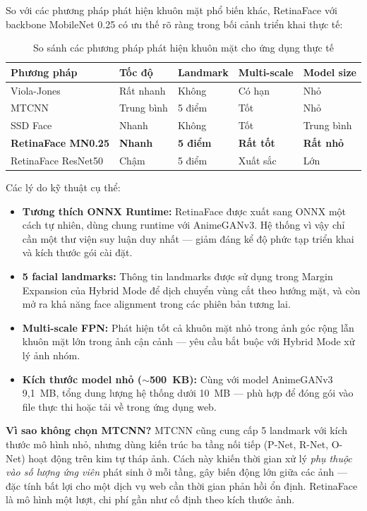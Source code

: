 So với các phương pháp phát hiện khuôn mặt phổ biến khác, RetinaFace với backbone MobileNet 0.25 có ưu thế rõ ràng trong bối cảnh triển khai thực tế:

\begin{table}[H]
\caption{So sánh các phương pháp phát hiện khuôn mặt cho ứng dụng thực tế}
\label{tab:face_det_comparison}
\centering
\begin{tabular}{|p{3cm}|p{2cm}|p{2.5cm}|p{2.5cm}|p{2.5cm}|}
\hline
\textbf{Phương pháp} & \textbf{Tốc độ} & \textbf{Landmark} & \textbf{Multi-scale} & \textbf{Model size} \\
\hline
Viola-Jones \cite{ViolaJones2004} & Rất nhanh & Không & Có hạn & Nhỏ \\
\hline
MTCNN \cite{Zhang2016MTCNN} & Trung bình & 5 điểm & Tốt & Nhỏ \\
\hline
SSD Face \cite{Liu2016SSD} & Nhanh & Không & Tốt & Trung bình \\
\hline
\textbf{RetinaFace MN0.25} \cite{Deng2019RetinaFace} & \textbf{Nhanh} & \textbf{5 điểm} & \textbf{Rất tốt} & \textbf{Rất nhỏ} \\
\hline
RetinaFace ResNet50 & Chậm & 5 điểm & Xuất sắc & Lớn \\
\hline
\end{tabular}
\end{table}

Các lý do kỹ thuật cụ thể:
\begin{itemize}
    \item \textbf{Tương thích ONNX Runtime:} RetinaFace được xuất sang ONNX một cách tự nhiên, dùng chung runtime với AnimeGANv3. Hệ thống vì vậy chỉ cần một thư viện suy luận duy nhất --- giảm đáng kể độ phức tạp triển khai và kích thước gói cài đặt.
    \item \textbf{5 facial landmarks:} Thông tin landmarks được sử dụng trong Margin Expansion của Hybrid Mode để dịch chuyển vùng cắt theo hướng mặt, và còn mở ra khả năng face alignment trong các phiên bản tương lai.
    \item \textbf{Multi-scale FPN:} Phát hiện tốt cả khuôn mặt nhỏ trong ảnh góc rộng lẫn khuôn mặt lớn trong ảnh cận cảnh --- yêu cầu bắt buộc với Hybrid Mode xử lý ảnh nhóm.
    \item \textbf{Kích thước model nhỏ ($\sim$500~KB):} Cùng với model AnimeGANv3 9,1~MB, tổng dung lượng hệ thống dưới 10~MB --- phù hợp để đóng gói vào file thực thi hoặc tải về trong ứng dụng web.
\end{itemize}

\textbf{Vì sao không chọn MTCNN?} MTCNN cũng cung cấp 5 landmark với kích thước mô hình nhỏ, nhưng dùng kiến trúc ba tầng nối tiếp (P-Net, R-Net, O-Net) hoạt động trên kim tự tháp ảnh. Cách này khiến thời gian xử lý \textit{phụ thuộc vào số lượng ứng viên} phát sinh ở mỗi tầng, gây biến động lớn giữa các ảnh --- đặc tính bất lợi cho một dịch vụ web cần thời gian phản hồi ổn định. RetinaFace là mô hình một lượt, chi phí gần như cố định theo kích thước ảnh.


